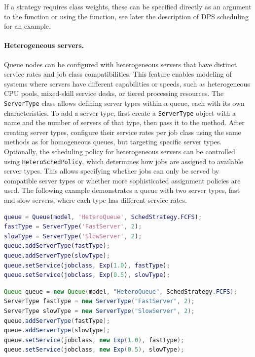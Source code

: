 If a strategy requires class weights, these can be specified directly as an argument to the  function or using the  function, see later the description of DPS scheduling for an example.

\paragraph{Heterogeneous servers.}
Queue nodes can be configured with heterogeneous servers that have distinct service rates and job class compatibilities. This feature enables modeling of systems where servers have different capabilities or speeds, such as heterogeneous CPU pools, mixed-skill service desks, or tiered processing resources. The \texttt{ServerType} class allows defining server types within a queue, each with its own characteristics. To add a server type, first create a \texttt{ServerType} object with a name and the number of servers of that type, then pass it to the  method. After creating server types, configure their service rates per job class using the same methods as for homogeneous queues, but targeting specific server types. Optionally, the scheduling policy for heterogeneous servers can be controlled using \texttt{HeteroSchedPolicy}, which determines how jobs are assigned to available server types. This allows specifying whether jobs can only be served by compatible server types or whether more sophisticated assignment policies are used. The following example demonstrates a queue with two server types, fast and slow servers, where each type has different service rates.
\begin{MATLAB}
\begin{lstlisting}[language = matlab]
queue = Queue(model, 'HeteroQueue', SchedStrategy.FCFS);
fastType = ServerType('FastServer', 2);
slowType = ServerType('SlowServer', 2);
queue.addServerType(fastType);
queue.addServerType(slowType);
queue.setService(jobclass, Exp(1.0), fastType);
queue.setService(jobclass, Exp(0.5), slowType);
\end{lstlisting}
\end{MATLAB}
\begin{JAVA}
\begin{lstlisting}[language = java, basicstyle=\ttfamily\scriptsize]
Queue queue = new Queue(model, "HeteroQueue", SchedStrategy.FCFS);
ServerType fastType = new ServerType("FastServer", 2);
ServerType slowType = new ServerType("SlowServer", 2);
queue.addServerType(fastType);
queue.addServerType(slowType);
queue.setService(jobclass, new Exp(1.0), fastType);
queue.setService(jobclass, new Exp(0.5), slowType);
\end{lstlisting}
\end{JAVA}
